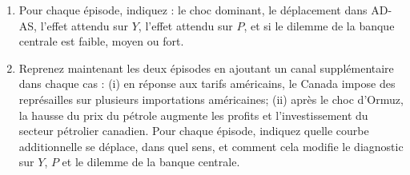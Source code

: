 
\begin{enumerate}[label=(\alph*)]
   \item Pour chaque épisode, indiquez : le choc dominant, le déplacement dans AD-AS, l'effet attendu sur $Y$, l'effet attendu sur $P$, et si le dilemme de la banque centrale est faible, moyen ou fort.
   \item Reprenez maintenant les deux épisodes en ajoutant un canal supplémentaire dans chaque cas : (i) en réponse aux tarifs américains, le Canada impose des représailles sur plusieurs importations américaines; (ii) après le choc d'Ormuz, la hausse du prix du pétrole augmente les profits et l'investissement du secteur pétrolier canadien. Pour chaque épisode, indiquez quelle courbe additionnelle se déplace, dans quel sens, et comment cela modifie le diagnostic sur $Y$, $P$ et le dilemme de la banque centrale.
\end{enumerate}


